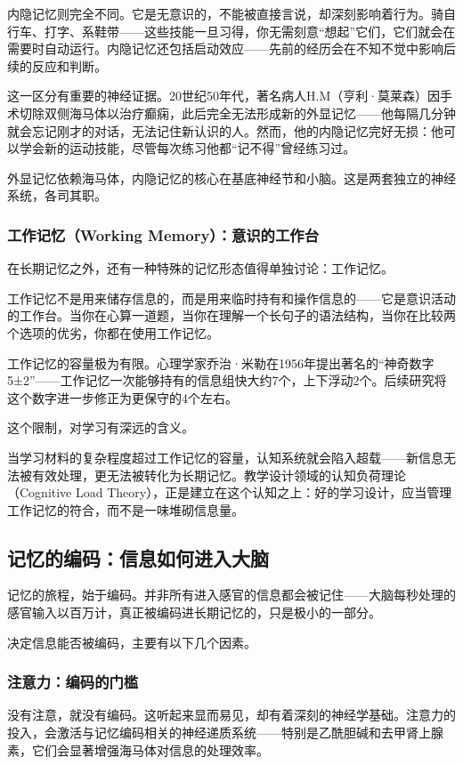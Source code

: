 \documentclass[11pt]{article}
\begin{document}
内隐记忆则完全不同。它是无意识的，不能被直接言说，却深刻影响着行为。骑自行车、打字、系鞋带——这些技能一旦习得，你无需刻意“想起”它们，它们就会在需要时自动运行。内隐记忆还包括启动效应——先前的经历会在不知不觉中影响后续的反应和判断。

这一区分有重要的神经证据。20世纪50年代，著名病人H.M（亨利·莫莱森）因手术切除双侧海马体以治疗癫痫，此后完全无法形成新的外显记忆——他每隔几分钟就会忘记刚才的对话，无法记住新认识的人。然而，他的内隐记忆完好无损：他可以学会新的运动技能，尽管每次练习他都“记不得”曾经练习过。

外显记忆依赖海马体，内隐记忆的核心在基底神经节和小脑。这是两套独立的神经系统，各司其职。
\subsubsection{工作记忆（Working Memory）：意识的工作台}
\label{sec:org42a0635}

在长期记忆之外，还有一种特殊的记忆形态值得单独讨论：工作记忆。

工作记忆不是用来储存信息的，而是用来临时持有和操作信息的——它是意识活动的工作台。当你在心算一道题，当你在理解一个长句子的语法结构，当你在比较两个选项的优劣，你都在使用工作记忆。

工作记忆的容量极为有限。心理学家乔治·米勒在1956年提出著名的“神奇数字5±2”——工作记忆一次能够持有的信息组快大约7个，上下浮动2个。后续研究将这个数字进一步修正为更保守的4个左右。

这个限制，对学习有深远的含义。

当学习材料的复杂程度超过工作记忆的容量，认知系统就会陷入超载——新信息无法被有效处理，更无法被转化为长期记忆。教学设计领域的认知负荷理论（Cognitive Load Theory），正是建立在这个认知之上：好的学习设计，应当管理工作记忆的符合，而不是一味堆砌信息量。
\subsection{记忆的编码：信息如何进入大脑}
\label{sec:org021493c}

记忆的旅程，始于编码。并非所有进入感官的信息都会被记住——大脑每秒处理的感官输入以百万计，真正被编码进长期记忆的，只是极小的一部分。

决定信息能否被编码，主要有以下几个因素。
\subsubsection{注意力：编码的门槛}
\label{sec:org171d0d9}

没有注意，就没有编码。这听起来显而易见，却有着深刻的神经学基础。注意力的投入，会激活与记忆编码相关的神经递质系统——特别是乙酰胆碱和去甲肾上腺素，它们会显著增强海马体对信息的处理效率。
\end{document}
